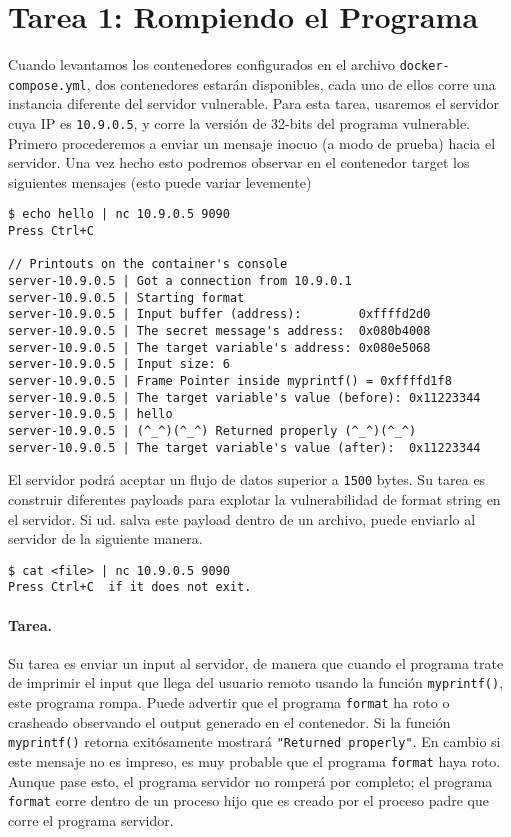 \section{Tarea 1: Rompiendo el Programa}

Cuando levantamos los contenedores configurados en el archivo \texttt{docker-compose.yml}, dos contenedores estarán disponibles, cada uno de ellos corre una instancia diferente del servidor vulnerable.
Para esta tarea, usaremos el servidor cuya IP es \texttt{10.9.0.5}, y corre la versión de 32-bits del programa vulnerable.
Primero procederemos a enviar un mensaje inocuo (a modo de prueba) hacia el servidor.
Una vez hecho esto podremos observar en el contenedor target los siguientes mensajes (esto puede variar levemente)

\begin{lstlisting}
$ echo hello | nc 10.9.0.5 9090
Press Ctrl+C

// Printouts on the container's console
server-10.9.0.5 | Got a connection from 10.9.0.1
server-10.9.0.5 | Starting format
server-10.9.0.5 | Input buffer (address):        0xffffd2d0
server-10.9.0.5 | The secret message's address:  0x080b4008
server-10.9.0.5 | The target variable's address: 0x080e5068
server-10.9.0.5 | Input size: 6
server-10.9.0.5 | Frame Pointer inside myprintf() = 0xffffd1f8
server-10.9.0.5 | The target variable's value (before): 0x11223344
server-10.9.0.5 | hello
server-10.9.0.5 | (^_^)(^_^) Returned properly (^_^)(^_^)
server-10.9.0.5 | The target variable's value (after):  0x11223344
\end{lstlisting}
 
El servidor podrá aceptar un flujo de datos superior a \texttt{1500} bytes. Su tarea es construir diferentes payloads para explotar la vulnerabilidad de format string en el servidor. Si ud. salva este payload dentro de un archivo, puede enviarlo al servidor de la siguiente manera.

\begin{lstlisting}
$ cat <file> | nc 10.9.0.5 9090
Press Ctrl+C  if it does not exit.
\end{lstlisting}

\paragraph{Tarea.} Su tarea es enviar un input al servidor, de manera que cuando el programa trate de imprimir el input que llega del usuario remoto usando la función \texttt{myprintf()}, este programa rompa. Puede advertir que el programa  \texttt{format} ha roto o crasheado observando el output generado en el contenedor. Si la función \texttt{myprintf()} retorna exitósamente mostrará \texttt{"Returned properly"}. 
En cambio si este mensaje no es impreso, es muy probable que el programa \texttt{format} haya roto.
Aunque pase esto, el programa servidor no romperá por completo; el programa \texttt{format} corre dentro de un proceso hijo que es creado por el proceso padre que corre el programa servidor.


